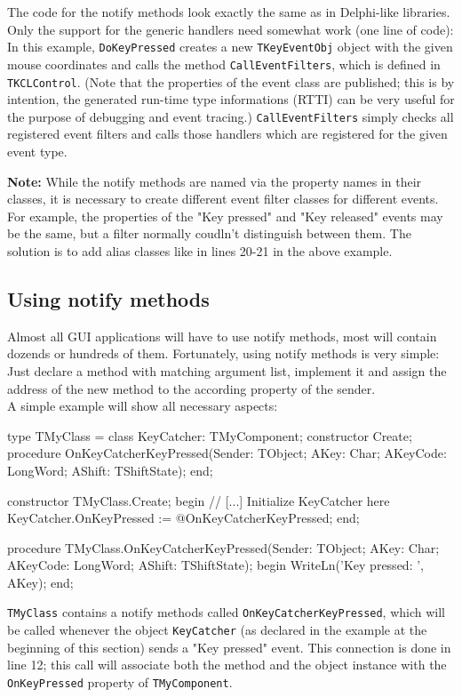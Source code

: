 The code for the notify methods look exactly the same as in Delphi-like
libraries. Only the support for the generic handlers need somewhat work
(one line of code): In this example, \texttt{DoKeyPressed} creates a new
\texttt{TKeyEventObj} object with the given mouse coordinates and calls
the method \texttt{CallEventFilters}, which is defined in \texttt{TKCLControl}.
(Note that the properties of the event class are published; this is by
intention, the generated run-time type informations (RTTI) can be very useful
for the purpose of debugging and event tracing.)
\texttt{CallEventFilters} simply checks all registered event filters and calls
those handlers which are registered for the given event type.\\
{\textbf{Note:} While the notify methods are named via the property names in
their classes, it is necessary to create different event filter classes for
different events. For example, the properties of the "Key pressed" and "Key
released" events may be the same, but a filter normally coudln't distinguish
between them. The solution is to add alias classes like in lines 20-21 in the
above example.

\subsection{Using notify methods}
Almost all GUI applications will have to use notify methods, most will
contain dozends or hundreds of them. Fortunately, using notify methods
is very simple: Just declare a method with matching argument list, implement
it and assign the address of the new method to the according property of the
sender.\\
A simple example will show all necessary aspects:
\small
\begin{listing}{1}
type
  TMyClass = class
    KeyCatcher: TMyComponent;
    constructor Create;
    procedure OnKeyCatcherKeyPressed(Sender: TObject; AKey: Char;
      AKeyCode: LongWord; AShift: TShiftState);
  end;

  constructor TMyClass.Create;
  begin
    // [...] Initialize KeyCatcher here
    KeyCatcher.OnKeyPressed := @OnKeyCatcherKeyPressed;
  end;

  procedure TMyClass.OnKeyCatcherKeyPressed(Sender: TObject;
    AKey: Char; AKeyCode: LongWord; AShift: TShiftState);
  begin
    WriteLn('Key pressed: ', AKey);
  end;
\end{listing}
\normalsize

\texttt{TMyClass} contains a notify methods called
\texttt{OnKeyCatcherKeyPressed}, which will be called whenever the object
\texttt{KeyCatcher} (as declared in the example at the beginning of this
section) sends a "Key pressed" event. This connection is done in line 12; this
call will associate both the method and the object instance with the
\texttt{OnKeyPressed} property of \texttt{TMyComponent}.

}
